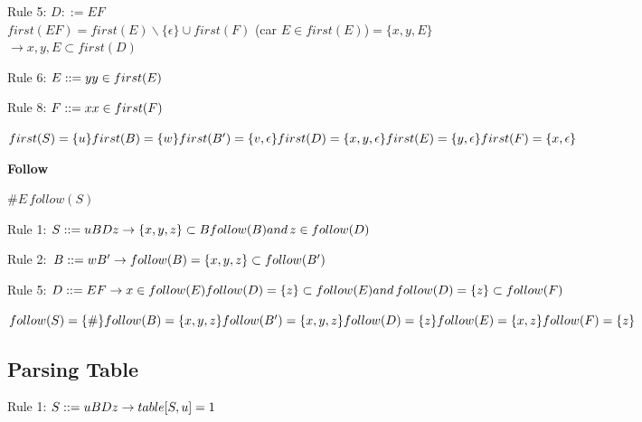             Rule 5: $D::= EF$\\
            $first(EF) = first(E) \backslash \{\epsilon\} \cup first(F)$ (car $E\in first(E)$)$=\{x,y,E\}$\\
            $\rightarrow {x,y,E} \subset first(D)$
            
            Rule 6: $E::= y\\
            y \in first(E)$
            
            Rule 8: $F::=x\\
            x \in first(F)$
            
            $first(S) = \{u\}\\
            first(B) = \{w\}\\
            first(B') = \{v,\epsilon\}\\
            first(D) = \{x,y,\epsilon\}\\
            first(E) = \{y,\epsilon\}\\
            first(F) = \{x, \epsilon\}$
            
            \textbf{Follow}
            
            $\#E \, follow(S)$
            
            Rule 1: $S::= uBDz\\
            \rightarrow \{x,y,z\} \subset B follow(B)\\
            and \, z \in follow(D)$
            
            Rule 2: $\, B::= wB'\\
            \rightarrow follow(B)=\{x,y,z\} \subset follow(B')$
            
            Rule 5: $D::=EF\\
            \rightarrow x \in follow(E)\\
            follow(D) = \{z\} \subset follow(E)\\
            and \, follow(D) = \{z\} \subset follow(F)$
             
            $follow(S) = \{\#\}\\
            follow(B) = \{x,y,z\}\\
            follow(B') = \{x,y,z\}\\
            follow(D) = \{z\}\\
            follow(E) = \{x,z\}\\
            follow(F) = \{z\}$
\subsection{Parsing Table}
          Rule 1: $S::= uBDz\\
            \rightarrow table[S,u] = 1$
            
